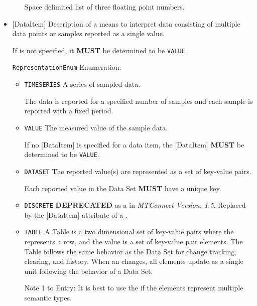 \begin{itemize}
\begin{itemize}
Space delimited list of three floating point numbers. 
\end{itemize}


\item {}[DataItem] \newline Description of a means to interpret data consisting of multiple data points or samples reported as a single value.  

If  is not specified, it \textbf{MUST} be determined to be \texttt{VALUE}.


\texttt{RepresentationEnum} Enumeration:

\begin{itemize}
\item \texttt{TIME\textunderscore SERIES} \newline A series of sampled data.

The data is reported for a specified number of samples and each sample is reported with a fixed period. 
\item \texttt{VALUE} \newline The measured value of the sample data.

If no [DataItem] is specified for a data item, the [DataItem] \textbf{MUST} be determined to be \texttt{VALUE}. 
\item \texttt{DATA\textunderscore SET} \newline The reported value(s) are represented as a set of \glspl{key-value pair}.

Each reported value in the \gls{Data Set} \textbf{MUST} have a unique key. 
\item \texttt{DISCRETE} \newline \textbf{DEPRECATED} as a  in \textit{MTConnect Version. 1.5}. Replaced by the [DataItem] attribute of a . 
\item \texttt{TABLE} \newline A \gls{Table} is a two dimensional set of \glspl{key-value pair} where the  represents a row, and the value is a set of \gls{key-value pair}  elements. The \gls{Table} follows the same behavior as the \gls{Data Set} for change tracking, clearing, and history. When an  changes, all  elements update as a single unit following the behavior of a \gls{Data Set}.

Note 1 to Entry: It is best to use the    if the  elements represent multiple
semantic types.


\end{itemize}
\end{itemize}
